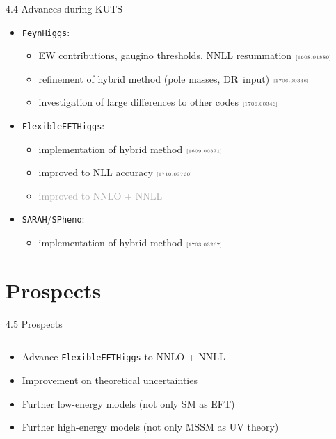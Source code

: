 \documentclass[hyperref={pdfpagelabels=false},ngerman]{beamer}
\newcommand{\mycite}[1]{\ensuremath{\text{\textcolor{darkgray}{\tiny [#1]}}}}
\newcommand{\DRbar}{\ensuremath{\overline{\text{DR}}}}
\newcommand{\feft}{\texttt{FlexibleEFTHiggs}\xspace}
\newcommand{\FH}{\texttt{FeynHiggs}\xspace}
\newcommand{\SPheno}{\texttt{SPheno}\xspace}
\newcommand{\SARAH}{\texttt{SARAH}\xspace}
\begin{document}
\begin{frame}{4.4 Advances during KUTS}
  \begin{itemize}
  \item \FH:
    \begin{itemize}
    \item EW contributions, gaugino thresholds, NNLL resummation \mycite{1608.01880}
    \item refinement of hybrid method (pole masses, \DRbar\ input) \mycite{1706.00346}
    \item investigation of large differences to other codes \mycite{1706.00346}
  \end{itemize}
  \item \feft:
    \begin{itemize}
    \item implementation of hybrid method \mycite{1609.00371}
    \item improved to NLL accuracy \mycite{1710.03760}
    \item \textcolor{darkgray}{improved to NNLO + NNLL}
  \end{itemize}
  \item \SARAH/\SPheno:
    \begin{itemize}
    \item implementation of hybrid method \mycite{1703.03267}
    \end{itemize}
  \end{itemize}
\end{frame}

\section{Prospects}

\begin{frame}{4.5 Prospects}
    \begin{columns}
    \begin{column}{0.5\textwidth}
      \centering
      \texttt{[image: \{\{plots/kuts-9/4.5]}}}
    \end{column}
    \begin{column}{0.5\textwidth}
      \begin{itemize}
      \item Advance \feft to NNLO + NNLL
      \item Improvement on theoretical uncertainties
      \item Further low-energy models (not only SM as EFT)
      \item Further high-energy models (not only MSSM as UV theory)
      \end{itemize}
    \end{column}
  \end{columns}
\end{frame}
\end{document}
